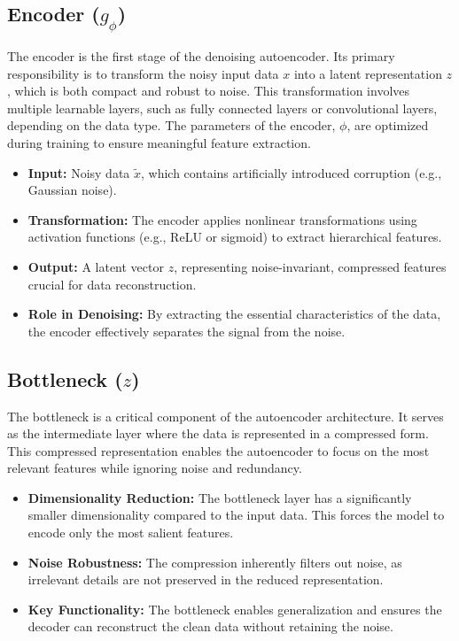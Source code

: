 \documentclass[a4paper,12pt]{article}
\begin{document}
\subsection{Encoder ($g_\phi$)}
The encoder is the first stage of the denoising autoencoder. Its primary responsibility is to transform the noisy input data ${x}$ into a latent representation $z$, which is both compact and robust to noise. This transformation involves multiple learnable layers, such as fully connected layers or convolutional layers, depending on the data type. The parameters of the encoder, $\phi$, are optimized during training to ensure meaningful feature extraction.

\begin{itemize}
    \item \textbf{Input:} Noisy data $\tilde{x}$, which contains artificially introduced corruption (e.g., Gaussian noise).
    \item \textbf{Transformation:} The encoder applies nonlinear transformations using activation functions (e.g., ReLU or sigmoid) to extract hierarchical features.
    \item \textbf{Output:} A latent vector $z$, representing noise-invariant, compressed features crucial for data reconstruction.
    \item \textbf{Role in Denoising:} By extracting the essential characteristics of the data, the encoder effectively separates the signal from the noise.
\end{itemize}
\subsection{Bottleneck ($z$)}
The bottleneck is a critical component of the autoencoder architecture. It serves as the intermediate layer where the data is represented in a compressed form. This compressed representation enables the autoencoder to focus on the most relevant features while ignoring noise and redundancy.

\begin{itemize}
    \item \textbf{Dimensionality Reduction:} The bottleneck layer has a significantly smaller dimensionality compared to the input data. This forces the model to encode only the most salient features.
    \item \textbf{Noise Robustness:} The compression inherently filters out noise, as irrelevant details are not preserved in the reduced representation.
    \item \textbf{Key Functionality:} The bottleneck enables generalization and ensures the decoder can reconstruct the clean data without retaining the noise.
\end{itemize}
\end{document}
